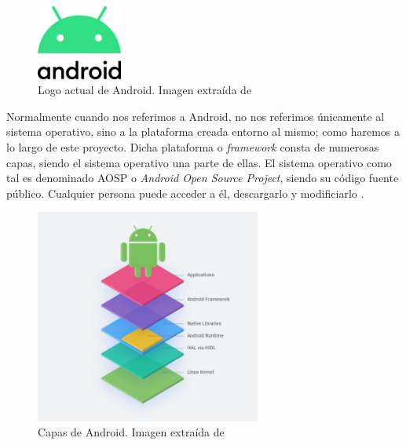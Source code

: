             \begin{figure}[h]
                \centering
                \includegraphics[width=0.25\textwidth]{figures/Android logo.png}
                \caption[Logo actual de Android.]
                {Logo actual de Android. Imagen extraída de \cite{vulcansphere_english_2019}}
                \label{figure:android:logo}
            \end{figure}

            Normalmente cuando nos referimos a Android, no nos referimos únicamente al sistema operativo, sino a la
            plataforma creada entorno al mismo; como haremos a lo largo de este proyecto. Dicha plataforma o 
            \textit{framework} consta de numerosas capas, siendo el sistema operativo una parte de ellas. El sistema 
            operativo como tal es denominado AOSP o \textit{Android Open Source Project}, siendo su código fuente 
            público. Cualquier persona puede acceder a él, descargarlo y modificiarlo \cite{collado_que_2022}.

            \begin{figure}[h]
                \centering
                \includegraphics[width=0.66\textwidth]{figures/Android capas.jpg}
                \caption[Capas de Android.]
                {Capas de Android. Imagen extraída de \cite{perez_aosp_2019}}
                \label{figure:android:capas}
            \end{figure}

